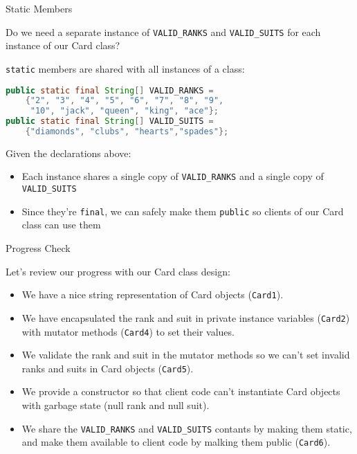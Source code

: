 \documentclass{beamer}
\begin{document}
\begin{frame}[fragile]{Static Members}


Do we need a separate instance of {\tt VALID\_RANKS} and {\tt VALID\_SUITS} for each instance of our Card class?

{\tt static} members are shared with all instances of a class:
\begin{lstlisting}[language=Java]
public static final String[] VALID_RANKS = 
    {"2", "3", "4", "5", "6", "7", "8", "9",
     "10", "jack", "queen", "king", "ace"};
public static final String[] VALID_SUITS =
    {"diamonds", "clubs", "hearts","spades"};
\end{lstlisting}
Given the declarations above:
\begin{itemize}
\item Each instance shares a single copy of {\tt VALID\_RANKS} and a single copy of {\tt VALID\_SUITS}
\item Since they're {\tt final}, we can safely make them {\tt public} so clients of our Card class can use them
\end{itemize}

\end{frame}

\begin{frame}[fragile]{Progress Check}


Let's review our progress with our Card class design:
\begin{itemize}
\item We have a nice string representation of Card objects ({\tt Card1}).
\item We have encapsulated the rank and suit in private instance variables ({\tt Card2}) with mutator methods ({\tt Card4}) to set their values.
\item We validate the rank and suit in the mutator methods so we can't set invalid ranks and suits in Card objects ({\tt Card5}).
\item We provide a constructor so that client code can't instantiate Card objects with garbage state (null rank and null suit).
\item We share the {\tt VALID\_RANKS} and {\tt VALID\_SUITS} contants by making them static, and make them available to client code by malking them public ({\tt Card6}).
\end{itemize}


\end{frame}
\end{document}
